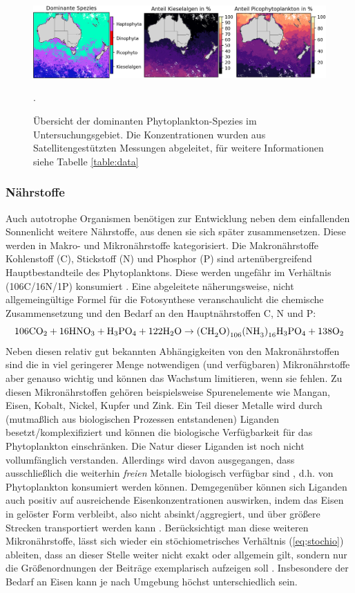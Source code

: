 \documentclass[12pt,a4paper,onecolumn,headheight=30pt]{scrartcl}
\newcommand{\cotwo}{CO\textsubscript{2}}
\begin{document}
\begin{figure}[htbp]
\includegraphics[width=\textwidth]{bilder/dominant_diatom_pico.png}
\caption{Übersicht der dominanten Phytoplankton-Spezies im Untersuchungsgebiet. Die Konzentrationen wurden aus Satellitengestützten Messungen abgeleitet, für weitere Informationen siehe Tabelle \ref{table:data}}. \label{fig:dominant_diatom_pico}
\end{figure}
\subsubsection{Nährstoffe} \label{sec:nährstoffe}
Auch autotrophe Organismen benötigen zur Entwicklung neben dem einfallenden Sonnenlicht weitere Nährstoffe, aus denen sie sich später zusammensetzen. Diese werden in Makro- und Mikronährstoffe kategorisiert. Die Makronährstoffe Kohlenstoff (C), Stickstoff (N) und Phosphor (P) sind artenübergreifend  Hauptbestandteile des Phytoplanktons. Diese werden ungefähr im Verhältnis (106C/16N/1P) konsumiert \citep{Falkowski.1998}. Eine abgeleitete näherungsweise, nicht allgemeingültige Formel für die Fotosynthese  \citep{Emerson.2009} veranschaulicht die chemische Zusammensetzung und den Bedarf an den Hauptnährstoffen C, N und P:
\begin{equation}
\text{106\cotwo} + \text{16HNO}_3 + \text{H}_3\text{PO}_4 + \text{122H}_2\text{O} \rightarrow \text{(CH}_2\text{O)}_{106}\text{(NH}_3\text{)}_{16}\text{H}_3\text{PO}_4 + \text{138O}_2
\end{equation}
Neben diesen relativ gut bekannten Abhängigkeiten von den Makronährstoffen sind die in viel geringerer Menge notwendigen (und verfügbaren) Mikronährstoffe aber genauso wichtig und können das Wachstum limitieren, wenn sie fehlen. Zu diesen Mikronährstoffen gehören beispielsweise Spurenelemente wie Mangan, Eisen, Kobalt, Nickel, Kupfer und Zink. Ein Teil dieser Metalle wird durch (mutmaßlich aus biologischen Prozessen entstandenen) Liganden besetzt/komplexifiziert und können die biologische Verfügbarkeit für das Phytoplankton einschränken. Die Natur dieser Liganden ist noch nicht vollumfänglich verstanden. Allerdings wird davon ausgegangen, dass ausschließlich die weiterhin \textit{freien} Metalle biologisch verfügbar sind \citep{Emerson.2009}, d.h. von Phytoplankton konsumiert werden können. Demgegenüber können sich Liganden auch positiv auf ausreichende Eisenkonzentrationen auswirken, indem das Eisen in gelöster Form verbleibt, also nicht absinkt/aggregiert, und über größere Strecken transportiert werden kann \citep{Tagliabue.2017}. Berücksichtigt man diese weiteren Mikronährstoffe, lässt sich wieder ein stöchiometrisches Verhältnis (\ref{eq;stochio}) ableiten, dass an dieser Stelle weiter nicht exakt oder allgemein gilt, sondern nur die Größenordnungen der Beiträge exemplarisch aufzeigen soll \citep{Emerson.2009}. Insbesondere der Bedarf an Eisen kann je nach Umgebung höchst unterschiedlich sein.
\end{document}
